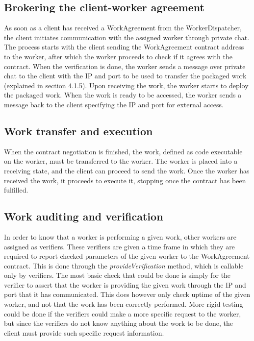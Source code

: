 \subsection{Brokering the client-worker agreement}
\label{sec:res:brokering}
As soon as a client has received a WorkAgreement from the WorkerDispatcher, the client initiates communication with the assigned worker through private chat. The process starts with the client sending the WorkAgreement contract address to the worker, after which the worker proceeds to check if it agrees with the contract. When the verification is done, the worker sends a message over private chat to the client with the IP and port to be used to transfer the packaged work (explained in section 4.1.5). Upon receiving the work, the worker starts to deploy the packaged work. When the work is ready to be accessed, the worker sends a message back to the client specifying the IP and port for external access.

\subsection{Work transfer and execution}
When the contract negotiation is finished, the work, defined as code executable on the worker, must be transferred to the worker. The worker is placed into a receiving state, and the client can proceed to send the work. Once the worker has received the work, it proceeds to execute it, stopping once the contract has been fulfilled. 

\subsection{Work auditing and verification}
\label{sec:res:auditing}
In order to know that a worker is performing a given work, other workers are assigned as verifiers. These verifiers are given a time frame in which they are required to report checked parameters of the given worker to the WorkAgreement contract. This is done through the \textit{provideVerification} method, which is callable only by verifiers. The most basic check that could be done is simply for the verifier to assert that the worker is providing the given work through the IP and port that it has communicated. This does however only check uptime of the given worker, and not that the work has been correctly performed. More rigid testing could be done if the verifiers could make a more specific request to the worker, but since the verifiers do not know anything about the work to be done, the client must provide such specific request information.

